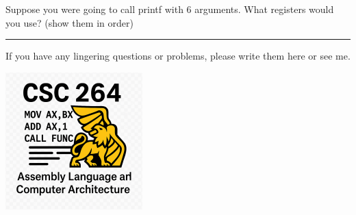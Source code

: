 \documentclass[letterpaper,12pt]{exam}
\begin{document}
\begin{questions}
\begin{samepage}
    \question Suppose you were going to call printf with 6 arguments.  What registers would you use?  (show them in order)
    \vspace{15mm}
\end{samepage}
\par





\end{questions} 
\begin{center}
    \rule{0.667\textwidth}{.8pt} %
\end{center}


If you have any lingering questions or problems, please write them here or see me.
\vfill
\begin{center}
\includegraphics{../csc264Logo}
\end{center}
\end{document}
